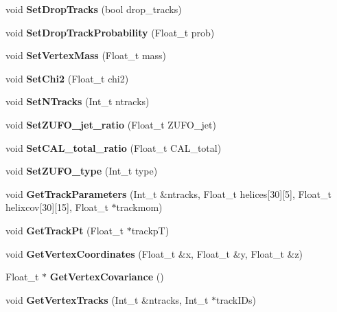 \begin{CompactItemize}
\item 
void \textbf{Set\-Drop\-Tracks} (bool drop\_\-tracks)\label{classTVertex_ae0c54891a9d25d83b2d64674572c15d}

\item 
void \textbf{Set\-Drop\-Track\-Probability} (Float\_\-t prob)\label{classTVertex_91a2748883e3225c7f09a67fa24b1951}

\item 
void \textbf{Set\-Vertex\-Mass} (Float\_\-t mass)\label{classTVertex_c1fc26d682e76533be9526d502b592c2}

\item 
void \textbf{Set\-Chi2} (Float\_\-t chi2)\label{classTVertex_90221a90bcc1420b4e4a39a9a731c013}

\item 
void \textbf{Set\-NTracks} (Int\_\-t ntracks)\label{classTVertex_70008f032aed4ee1f1a691345b3c6d6f}

\item 
void \textbf{Set\-ZUFO\_\-jet\_\-ratio} (Float\_\-t ZUFO\_\-jet)\label{classTVertex_feb80de531b29a015fe9686e7d1803ad}

\item 
void \textbf{Set\-CAL\_\-total\_\-ratio} (Float\_\-t CAL\_\-total)\label{classTVertex_78e5972ecc19f970282fef3377e1b763}

\item 
void \textbf{Set\-ZUFO\_\-type} (Int\_\-t type)\label{classTVertex_67601944eb1a21b61efb277c862a4d80}

\item 
void \textbf{Get\-Track\-Parameters} (Int\_\-t \&ntracks, Float\_\-t helices[30][5], Float\_\-t helixcov[30][15], Float\_\-t $\ast$trackmom)\label{classTVertex_c61fb892d9fcceb6de702e42d25609c9}

\item 
void \textbf{Get\-Track\-Pt} (Float\_\-t $\ast$trackp\-T)\label{classTVertex_f44f9b081d55afa045fb91762d591cfc}

\item 
void \textbf{Get\-Vertex\-Coordinates} (Float\_\-t \&x, Float\_\-t \&y, Float\_\-t \&z)\label{classTVertex_5f33234c0d8284ebf4028ca38015b5c6}

\item 
Float\_\-t $\ast$ \textbf{Get\-Vertex\-Covariance} ()\label{classTVertex_3a9f670bad415783d500e28c65d5dd05}

\item 
void \textbf{Get\-Vertex\-Tracks} (Int\_\-t \&ntracks, Int\_\-t $\ast$track\-IDs)\label{classTVertex_089a50110ef5368275481901718d529e}


\end{CompactItemize}
